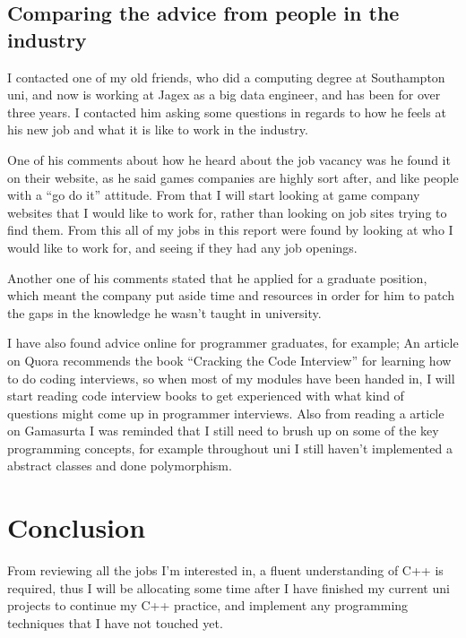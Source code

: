 \documentclass{scrartcl}
\begin{document}
\subsection{Comparing the advice from people in the industry}

I contacted one of my old friends, who did a computing degree at Southampton uni, and now is working at Jagex as a big data engineer, and has been for over three years. 
I contacted him asking some questions in regards to how he feels at his new job and what it is like to work in the industry.

One of his comments about how he heard about the job vacancy was he found it on their website, as he said games companies are highly sort after, and like people with a ``go do it'' attitude.
From that I will start looking at game company websites that I would like to work for, rather than looking on job sites trying to find them. 
From this all of my jobs in this report were found by looking at who I would like to work for, and seeing if they had any job openings.

Another one of his comments stated that he applied for a graduate position, which meant the company put aside time and resources in order for him to patch the gaps in the knowledge he wasn't taught in university.

 I have also found advice online for programmer graduates, for example;
An article on Quora \cite{codeBookreview} recommends the book ``Cracking the Code Interview'' \cite{Chinmoy} for learning how to do coding interviews, so when most of my modules have been handed in, I will start reading code interview books to get experienced with what kind of questions might come up in programmer interviews.
Also from reading a article on Gamasurta \cite{programmerAdvice} I was reminded that I still need to brush up on some of the key programming concepts, for example throughout uni I still haven't implemented a abstract classes and done polymorphism.


\section{Conclusion}

From reviewing all the jobs I'm interested in, a fluent understanding of C++ is required, thus I will be allocating some time after I have finished my current uni projects to continue my C++ practice, and implement any programming techniques that I have not touched yet.
\end{document}
